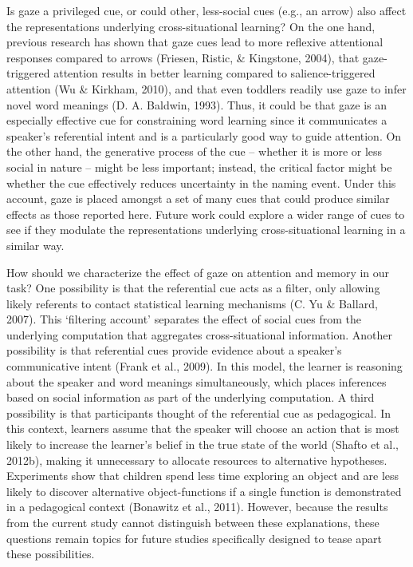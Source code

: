 \documentclass[oneside]{report}
\begin{document}
Is gaze a privileged cue, or could other, less-social cues (e.g., an
arrow) also affect the representations underlying cross-situational
learning? On the one hand, previous research has shown that gaze cues
lead to more reflexive attentional responses compared to arrows
(Friesen, Ristic, \& Kingstone, 2004), that gaze-triggered attention
results in better learning compared to salience-triggered attention (Wu
\& Kirkham, 2010), and that even toddlers readily use gaze to infer
novel word meanings (D. A. Baldwin, 1993). Thus, it could be that gaze
is an especially effective cue for constraining word learning since it
communicates a speaker's referential intent and is a particularly good
way to guide attention. On the other hand, the generative process of the
cue -- whether it is more or less social in nature -- might be less
important; instead, the critical factor might be whether the cue
effectively reduces uncertainty in the naming event. Under this account,
gaze is placed amongst a set of many cues that could produce similar
effects as those reported here. Future work could explore a wider range
of cues to see if they modulate the representations underlying
cross-situational learning in a similar way.

How should we characterize the effect of gaze on attention and memory in
our task? One possibility is that the referential cue acts as a filter,
only allowing likely referents to contact statistical learning
mechanisms (C. Yu \& Ballard, 2007). This `filtering account' separates
the effect of social cues from the underlying computation that
aggregates cross-situational information. Another possibility is that
referential cues provide evidence about a speaker's communicative intent
(Frank et al., 2009). In this model, the learner is reasoning about the
speaker and word meanings simultaneously, which places inferences based
on social information as part of the underlying computation. A third
possibility is that participants thought of the referential cue as
pedagogical. In this context, learners assume that the speaker will
choose an action that is most likely to increase the learner's belief in
the true state of the world (Shafto et al., 2012b), making it
unnecessary to allocate resources to alternative hypotheses. Experiments
show that children spend less time exploring an object and are less
likely to discover alternative object-functions if a single function is
demonstrated in a pedagogical context (Bonawitz et al., 2011). However,
because the results from the current study cannot distinguish between
these explanations, these questions remain topics for future studies
specifically designed to tease apart these possibilities.
\end{document}
